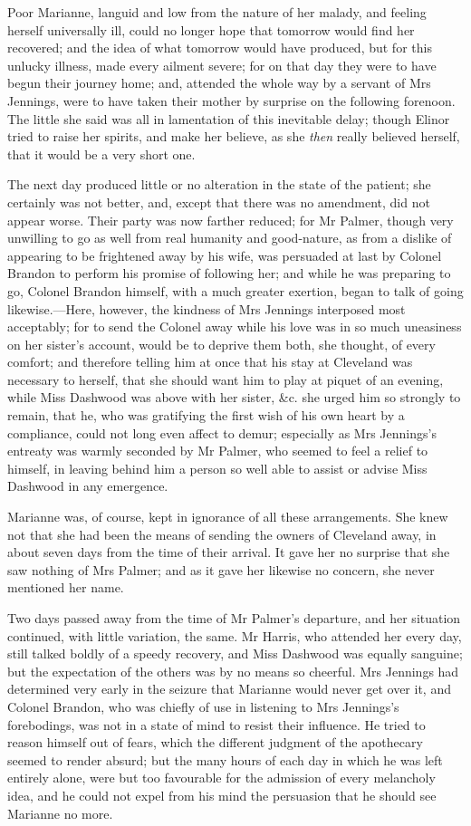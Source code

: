 Poor Marianne, languid and low from the nature of her malady, and feeling herself universally ill, could no longer hope that tomorrow would find her recovered; and the idea of what tomorrow would have produced, but for this unlucky illness, made every ailment severe; for on that day they were to have begun their journey home; and, attended the whole way by a servant of Mrs Jennings, were to have taken their mother by surprise on the following forenoon. The little she said was all in lamentation of this inevitable delay; though Elinor tried to raise her spirits, and make her believe, as she \textit{then} really believed herself, that it would be a very short one.

The next day produced little or no alteration in the state of the patient; she certainly was not better, and, except that there was no amendment, did not appear worse. Their party was now farther reduced; for Mr Palmer, though very unwilling to go as well from real humanity and good-nature, as from a dislike of appearing to be frightened away by his wife, was persuaded at last by Colonel Brandon to perform his promise of following her; and while he was preparing to go, Colonel Brandon himself, with a much greater exertion, began to talk of going likewise.—Here, however, the kindness of Mrs Jennings interposed most acceptably; for to send the Colonel away while his love was in so much uneasiness on her sister's account, would be to deprive them both, she thought, of every comfort; and therefore telling him at once that his stay at Cleveland was necessary to herself, that she should want him to play at piquet of an evening, while Miss Dashwood was above with her sister, \&c. she urged him so strongly to remain, that he, who was gratifying the first wish of his own heart by a compliance, could not long even affect to demur; especially as Mrs Jennings's entreaty was warmly seconded by Mr Palmer, who seemed to feel a relief to himself, in leaving behind him a person so well able to assist or advise Miss Dashwood in any emergence.

Marianne was, of course, kept in ignorance of all these arrangements. She knew not that she had been the means of sending the owners of Cleveland away, in about seven days from the time of their arrival. It gave her no surprise that she saw nothing of Mrs Palmer; and as it gave her likewise no concern, she never mentioned her name.

Two days passed away from the time of Mr Palmer's departure, and her situation continued, with little variation, the same. Mr Harris, who attended her every day, still talked boldly of a speedy recovery, and Miss Dashwood was equally sanguine; but the expectation of the others was by no means so cheerful. Mrs Jennings had determined very early in the seizure that Marianne would never get over it, and Colonel Brandon, who was chiefly of use in listening to Mrs Jennings's forebodings, was not in a state of mind to resist their influence. He tried to reason himself out of fears, which the different judgment of the apothecary seemed to render absurd; but the many hours of each day in which he was left entirely alone, were but too favourable for the admission of every melancholy idea, and he could not expel from his mind the persuasion that he should see Marianne no more.

